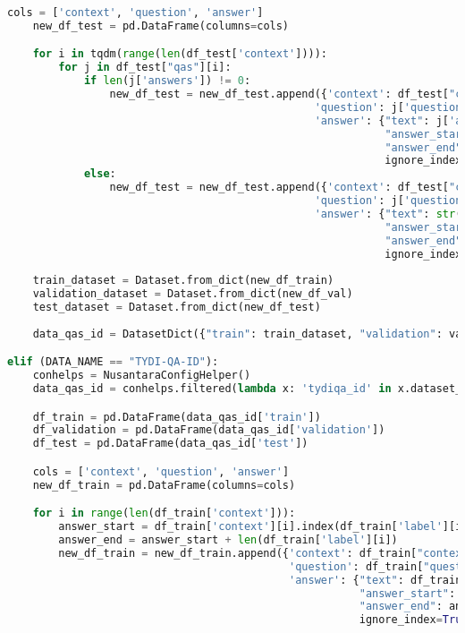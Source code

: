 \begin{lstlisting}[language=Python, caption=Mengimpor \emph{dataset} sistem tanya jawab]
    cols = ['context', 'question', 'answer']
    new_df_test = pd.DataFrame(columns=cols)

    for i in tqdm(range(len(df_test['context']))):
        for j in df_test["qas"][i]:
            if len(j['answers']) != 0:
                new_df_test = new_df_test.append({'context': df_test["context"][i], 
                                                'question': j['question'], 
                                                'answer': {"text": j['answers'][0]['text'], 
                                                           "answer_start": j['answers'][0]['answer_start'], 
                                                           "answer_end": j['answers'][0]['answer_start'] + len(j['answers'][0]['text'])}}, 
                                                           ignore_index=True)
            else:
                new_df_test = new_df_test.append({'context': df_test["context"][i], 
                                                'question': j['question'], 
                                                'answer': {"text": str(), 
                                                           "answer_start": 0, 
                                                           "answer_end": 0}}, 
                                                           ignore_index=True)
    
    train_dataset = Dataset.from_dict(new_df_train)
    validation_dataset = Dataset.from_dict(new_df_val)
    test_dataset = Dataset.from_dict(new_df_test)
    
    data_qas_id = DatasetDict({"train": train_dataset, "validation": validation_dataset, "test": test_dataset})

elif (DATA_NAME == "TYDI-QA-ID"):
    conhelps = NusantaraConfigHelper()
    data_qas_id = conhelps.filtered(lambda x: 'tydiqa_id' in x.dataset_name)[0].load_dataset()

    df_train = pd.DataFrame(data_qas_id['train'])
    df_validation = pd.DataFrame(data_qas_id['validation'])
    df_test = pd.DataFrame(data_qas_id['test'])

    cols = ['context', 'question', 'answer']
    new_df_train = pd.DataFrame(columns=cols)

    for i in range(len(df_train['context'])):
        answer_start = df_train['context'][i].index(df_train['label'][i])
        answer_end = answer_start + len(df_train['label'][i])
        new_df_train = new_df_train.append({'context': df_train["context"][i], 
                                            'question': df_train["question"][i], 
                                            'answer': {"text": df_train["label"][i], 
                                                       "answer_start": answer_start, 
                                                       "answer_end": answer_end}}, 
                                                       ignore_index=True)


\end{lstlisting}
